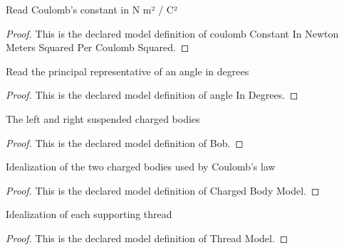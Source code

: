 \begin{definition}
  \label{def:physics:phyx-mini-0901:phyxminiproblems-problemphyxmini0901-coulombconstantinnewtonmeterssquaredpercoulombsquared}
  Read Coulomb's constant in N m² / C²
\end{definition}
\begin{proof}
  This is the declared model definition of coulomb Constant In Newton Meters Squared Per Coulomb Squared.
\end{proof}
\begin{definition}
  \label{def:physics:phyx-mini-0901:phyxminiproblems-problemphyxmini0901-angleindegrees}
  Read the principal representative of an angle in degrees
\end{definition}
\begin{proof}
  This is the declared model definition of angle In Degrees.
\end{proof}
\begin{definition}[Bob]
  \label{def:physics:phyx-mini-0901:phyxminiproblems-problemphyxmini0901-bob}
  The left and right suspended charged bodies
\end{definition}
\begin{proof}
  This is the declared model definition of Bob.
\end{proof}
\begin{definition}
  \label{def:physics:phyx-mini-0901:phyxminiproblems-problemphyxmini0901-chargedbodymodel}
  Idealization of the two charged bodies used by Coulomb's law
\end{definition}
\begin{proof}
  This is the declared model definition of Charged Body Model.
\end{proof}
\begin{definition}
  \label{def:physics:phyx-mini-0901:phyxminiproblems-problemphyxmini0901-threadmodel}
  Idealization of each supporting thread
\end{definition}
\begin{proof}
  This is the declared model definition of Thread Model.
\end{proof}
